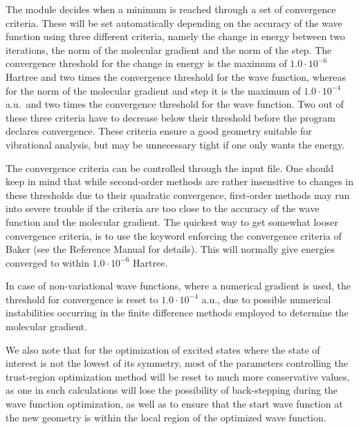 The  module decides when a minimum is reached through a
set of convergence criteria. These will be
set automatically depending on the accuracy of the wave function
using three different criteria, namely the change in energy
between two iterations, the norm of the molecular
gradient and the norm of the
step. The convergence threshold for the change
in energy is the maximum of $1.0\cdot 10^{-6}$ Hartree and two times the
convergence threshold for the wave function, whereas for the norm of
the molecular gradient and step it is the maximum of $1.0\cdot 10^{-4}$ a.u.\ and
two times the 
convergence threshold for the wave function. Two out of these
three criteria have to decrease below their threshold before the program
declares convergence. These criteria ensure a good geometry
suitable for vibrational analysis, but may be unnecessary tight if
one only wants the energy.

The convergence criteria can be controlled through the input file. One
should keep in mind that while second-order methods are rather
insensitive to changes in these thresholds due to their quadratic
convergence, first-order methods may run into severe trouble if the
criteria are too close to the accuracy of the wave function and the
molecular gradient. The quickest way to get somewhat looser convergence
criteria, is to use the keyword  enforcing the convergence
criteria of Baker\cite{Baker} (see the Reference Manual for
details). This will normally give energies converged to within
$1.0\cdot 10^{-6}$ Hartree.

In case of non-variational
wave functions, where a numerical 
gradient is used, the threshold for
convergence is reset to 
$1.0\cdot 10^{-4}$ a.u., due to possible numerical
instabilities occurring in the 
finite difference methods employed to
determine the molecular gradient.

We also note that for the optimization of excited
states
where the state of interest is not the lowest of its
symmetry, most of the parameters controlling the trust-region
optimization method will be reset to much more conservative
values, as one in such calculations will lose the possibility of
back-stepping during the wave function optimization, as well as
to ensure that the start wave function at the new geometry
is within the local region of the optimized wave function.

